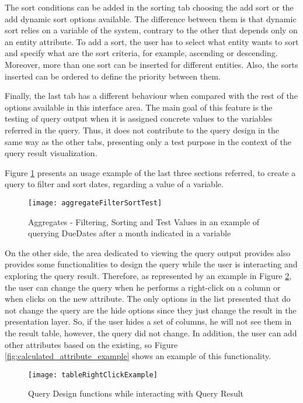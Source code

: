 The sort conditions can be added in the sorting tab choosing the add sort or the add dynamic sort options available. The difference between them is that dynamic sort relies on a variable of the system, contrary to the other that depends only on an entity attribute. To add a sort, the user has to select what entity wants to sort and specify what are the sort criteria, for example, ascending or descending.  Moreover, more than one sort can be inserted for different entities. Also, the sorts inserted can be ordered to define the priority between them.

Finally, the last tab has a different behaviour when compared with the rest of the options available in this interface area. The main goal of this feature is the testing of query output when it is assigned concrete values to the variables referred in the query. Thus, it does not contribute to the query design in the same way as the other tabs, presenting only a test purpose in the context of the query result visualization.

Figure \ref{fig:aggregates_filter_sort_test} presents an usage example of the last three sections referred, to create a query to filter and sort dates, regarding a value of a variable.

\begin{figure}[htbp]
	\centering
	\texttt{[image: aggregateFilterSortTest]}
	\caption{Aggregates - Filtering, Sorting and Test Values in an example of querying DueDates after a month indicated in a variable}
	\label{fig:aggregates_filter_sort_test}
\end{figure}

On the other side, the area dedicated to viewing the query output provides also provides some functionalities to design the query while the user is interacting and exploring the query result. Therefore, as represented by an example in Figure \ref{fig:table_right_click_example}, the user can change the query when he performs a right-click on a column or when clicks on the new attribute. The only options in the list presented that do not change the query are the hide options since they just change the result in the presentation layer. So, if the user hides a set of columns, he will not see them in the result table, however, the query did not change. In addition, the user can add other attributes based on the existing, so Figure \ref{fig:calculated_attribute_example} shows an example of this functionality.

\begin{figure}[htbp]
	\centering
	\texttt{[image: tableRightClickExample]}
	\caption{Query Design functions while interacting with Query Result}
	\label{fig:table_right_click_example}
\end{figure}

